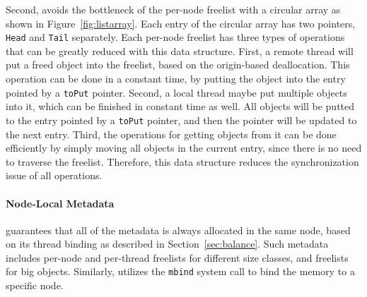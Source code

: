 Second, \NM{} avoids the bottleneck of the per-node freelist with a circular array as shown in Figure~\ref{fig:listarray}. Each entry of the circular array has two pointers, \texttt{Head} and \texttt{Tail} separately. Each per-node freelist has three types of operations that can be greatly reduced with this data structure. First, a remote thread will put a freed object into the freelist, based on the origin-based deallocation. This operation can be done in a constant time, by putting the object into the entry pointed by a \texttt{toPut} pointer. Second, a local thread maybe put multiple objects into it, which can be finished in constant time as well. All objects will be putted to the entry pointed by a \texttt{toPut} pointer, and then the pointer will be updated to the next entry. Third, the operations for getting objects from it can be done efficiently by simply moving all objects in the current entry, since there is no need to traverse the freelist. Therefore, this data structure reduces the synchronization issue of all operations. 

\paragraph{Node-Local Metadata} \NM{} guarantees that all of the metadata is always allocated in the same node, based on its thread binding as described in Section~\ref{sec:balance}. Such metadata includes per-node and per-thread freelists for different size classes, and freelists for big objects. Similarly, \NM{} utilizes the \texttt{mbind} system call to bind the memory to a specific node.  

